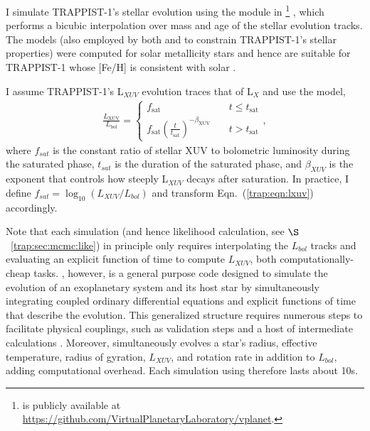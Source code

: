 I simulate TRAPPIST-1's stellar evolution using the \stellar module in \vplanet\footnote{\vplanet is publicly available at \href{https://github.com/VirtualPlanetaryLaboratory/vplanet}{https://github.com/VirtualPlanetaryLaboratory/vplanet}.} \citep{Barnes2019}, which performs a bicubic interpolation over mass and age of the \citet{Baraffe2015} stellar evolution tracks. The \citet{Baraffe2015} models (also employed by both \citet{Burgasser2017} and \citet{vanGrootel2018} to constrain TRAPPIST-1's stellar properties) were computed for solar metallicity stars and hence are suitable for TRAPPIST-1 whose [Fe/H] is consistent with solar \citep[][see also \citet{Burgasser2017}]{Gillon2016}.

I assume TRAPPIST-1's L$_{XUV}$ evolution traces that of L$_{X}$ and use the \citet{Ribas2005} model,
\begin{align}
\label{trap:eqn:lxuv}
\frac{L_\mathrm{XUV}}{L_\mathrm{bol}} = \left\{
				\begin{array}{lcr}
					f_\mathrm{sat} &\ & t \leq t_\mathrm{sat} \\
					f_\mathrm{sat}\left(\frac{t}{t_\mathrm{sat}}\right)^{-\beta_\mathrm{XUV}} &\ & t > t_\mathrm{sat}
				\end{array}
				\right.,
\end{align}
where $f_{sat}$ is the constant ratio of stellar XUV to bolometric luminosity during the saturated phase, $t_{sat}$ is the duration of the saturated phase, and $\beta_{XUV}$ is the exponent that controls how steeply L$_{XUV}$ decays after saturation. In practice, I define $f_{sat} = \log_{10}(L_{XUV}/L_{bol})$ and transform Eqn.~(\ref{trap:eqn:lxuv}) accordingly.

Note that each \vplanet simulation (and hence likelihood calculation, see $\S$~\ref{trap:sec:mcmc:like}) in principle only requires interpolating the \citet{Baraffe2015} $L_{bol}$ tracks and evaluating an explicit function of time to compute $L_{XUV}$, both computationally-cheap tasks. \vplanet, however, is a general purpose code designed to simulate the evolution of an exoplanetary system and its host star by simultaneously integrating coupled ordinary differential equations and explicit functions of time that describe the evolution. This generalized structure requires numerous steps to facilitate physical couplings, such as validation steps and a host of intermediate calculations \citep[for more details, see][]{Barnes2019}. Moreover, \stellar simultaneously evolves a star's radius, effective temperature, radius of gyration, $L_{XUV}$, and rotation rate in addition to $L_{bol}$, adding computational overhead. Each \vplanet simulation using \stellar therefore lasts about 10s.


